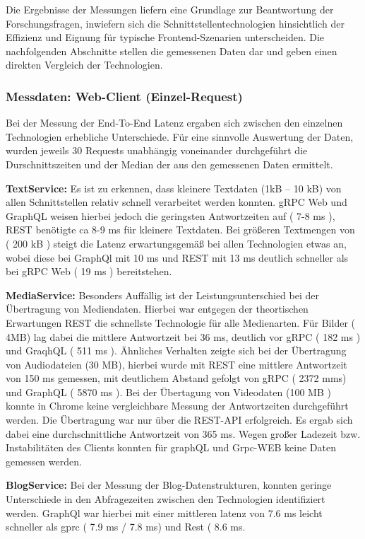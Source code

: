 Die Ergebnisse der Messungen liefern eine Grundlage zur Beantwortung der Forschungsfragen, inwiefern sich die Schnittstellentechnologien hinsichtlich der Effizienz und Eignung für typische Frontend-Szenarien unterscheiden.  
Die nachfolgenden Abschnitte stellen die gemessenen Daten dar und geben einen direkten Vergleich der Technologien.

\clearpage
\subsubsection*{Messdaten: Web-Client (Einzel-Request)}

Bei der Messung der End-To-End Latenz ergaben sich zwischen den einzelnen Technologien erhebliche Unterschiede. 
Für eine sinnvolle Auswertung der Daten, wurden jeweils 30 Requests unabhängig voneinander durchgeführt die Durschnittszeiten und der Median der aus den gemessenen Daten ermittelt. 


\textbf{TextService:}  
Es ist zu erkennen, dass kleinere Textdaten (1kB – 10 kB) von allen Schnittstellen relativ schnell verarbeitet werden konnten. gRPC Web und GraphQL weisen hierbei jedoch die geringsten Antwortzeiten auf ( 7-8 ms ), REST benötigte ca 8-9 ms für kleinere Textdaten. Bei größeren Textmengen von ( 200 kB ) steigt die Latenz erwartungsgemäß bei allen Technologien etwas an, wobei diese bei GraphQl mit 10 ms und REST mit 13 ms deutlich schneller als bei gRPC Web ( 19 ms ) bereitstehen. 

\textbf{MediaService:}  
Besonders Auffällig ist der Leistungsunterschied bei der Übertragung von Mediendaten.
Hierbei war entgegen der theortischen Erwartungen REST die schnellste Technologie für alle Medienarten. Für Bilder ( 4MB) lag dabei die mittlere Antwortzeit bei 36 ms, deutlich vor gRPC ( 182 ms ) und GraqhQL ( 511 ms ).
Ähnliches Verhalten zeigte sich bei der Übertragung von Audiodateien (30 MB), hierbei wurde mit REST eine mittlere Antwortzeit von 150 ms gemessen, mit deutlichem Abstand gefolgt von gRPC ( 2372 mms) und GraphQL ( 5870  ms ).
Bei der Übertagung von Videodaten (100 MB ) konnte in Chrome keine vergleichbare Messung der Antwortzeiten durchgeführt werden. Die Übertragung war nur über die REST-API erfolgreich. Es ergab sich dabei eine durchschnittliche Antwortzeit von 365 ms. Wegen großer Ladezeit bzw. Instabilitäten des Clients konnten für graphQL und Grpc-WEB keine Daten gemessen werden. 


\textbf{BlogService:}  
Bei der Messung der Blog-Datenstrukturen, konnten geringe Unterschiede in den Abfragezeiten zwischen den Technologien identifiziert werden. GraphQl war hierbei mit einer mittleren latenz von 7.6 ms leicht schneller als gprc ( 7.9 ms / 7.8 ms) und Rest ( 8.6 ms.


